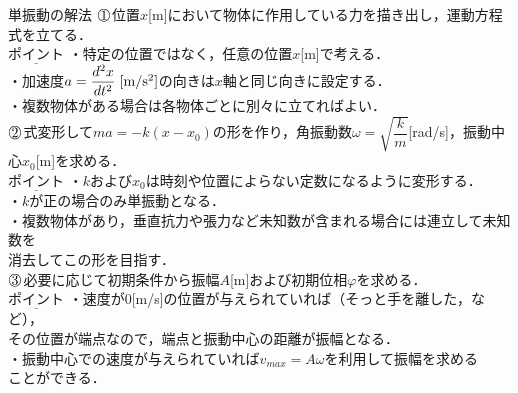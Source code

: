  
 \begin{matome}{単振動の解法}
 \hspace{3mm} $\MARU{1}$\hspace{2mm}位置$x$\hspace{1mm}[m]において物体に作用している力を描き出し，運動方程式を立てる．\\
 \hspace{10mm} $\underline{ポイント}$ ・特定の位置ではなく，任意の位置$x$[m]で考える．\\
  \hspace{24mm}  ・加速度$a=\dfrac{d^2x}{dt^2} \hspace{1mm} {\rm [m/s^2]}$の向きは$x$軸と同じ向きに設定する．\\
  \hspace{24mm}  ・複数物体がある場合は各物体ごとに別々に立てればよい．\\
 \hspace{3mm} $\MARU{2}$\hspace{2mm}式変形して$ma=-k(x-x_0)$の形を作り，角振動数$\omega=\sqrt{\dfrac{k}{m}}$\hspace{1mm}[rad/s]，振動中心$x_0$[m]を求める．\\
 \hspace{10mm} $\underline{ポイント}$ ・$k$および$x_0$は時刻や位置によらない定数になるように変形する．\\
  \hspace{24mm}  ・$k$が正の場合のみ単振動となる．\\
  \hspace{24mm}  ・複数物体があり，垂直抗力や張力など未知数が含まれる場合には連立して未知数を\\ \hspace{28mm}消去してこの形を目指す．\\
   \hspace{3mm} $\MARU{3}$\hspace{2mm}必要に応じて初期条件から振幅$A$\hspace{1mm}[m]および初期位相$\varphi$を求める．\\
 \hspace{10mm} $\underline{ポイント}$ ・速度が0\hspace{1mm}[m/s]の位置が与えられていれば（そっと手を離した，など），\\ \hspace{28mm}その位置が端点なので，端点と振動中心の距離が振幅となる．\\
  \hspace{24mm}  ・振動中心での速度が与えられていれば$v_{max}=A\omega $を利用して振幅を求める\\ \hspace{28mm}ことができる．\\

\end{matome}
